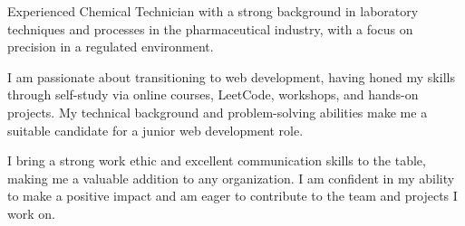 \documentclass{resume} %
\begin{document}
\begin{figure}
  \centering
\end{figure}

Experienced Chemical Technician with a strong background in laboratory techniques and processes in the pharmaceutical industry, with a focus on precision in a regulated environment.

I am passionate about transitioning to web development, having honed my skills through self-study via online courses, LeetCode, workshops, and hands-on projects. My technical background and problem-solving abilities make me a suitable candidate for a junior web development role.

I bring a strong work ethic and excellent communication skills to the table, making me a valuable addition to any organization. I am confident in my ability to make a positive impact and am eager to contribute to the team and projects I work on.
\end{document}
